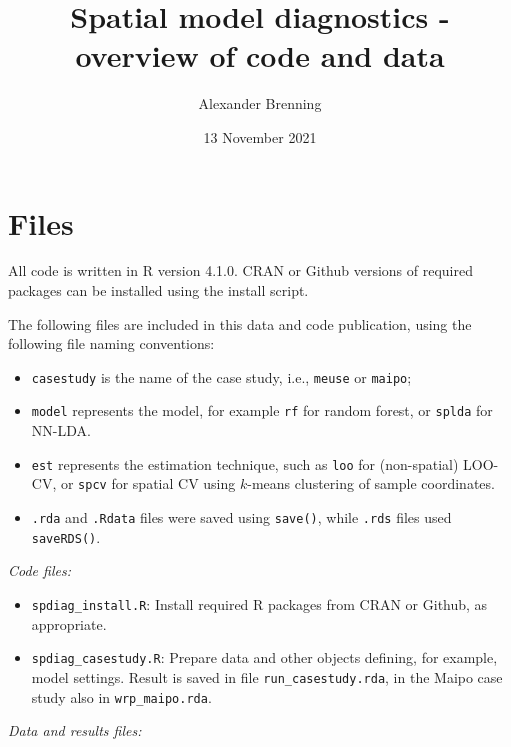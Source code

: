 \documentclass[
]{article}
\title{Spatial model diagnostics - overview of code and data}
\author{Alexander Brenning}
\date{13 November 2021}
\providecommand{\tightlist}{%
  \setlength{\itemsep}{0pt}\setlength{\parskip}{0pt}}
\begin{document}
\maketitle

\hypertarget{files}{%
\section{Files}\label{files}}

All code is written in R version 4.1.0.
CRAN or Github versions of required packages can be installed using the install script.

The following files are included in this data and code publication, using the following file naming conventions:

\begin{itemize}
\tightlist
\item
  \texttt{casestudy} is the name of the case study, i.e., \texttt{meuse} or \texttt{maipo};
\item
  \texttt{model} represents the model, for example \texttt{rf} for random forest, or \texttt{splda} for NN-LDA.
\item
  \texttt{est} represents the estimation technique, such as \texttt{loo} for (non-spatial) LOO-CV, or \texttt{spcv} for spatial CV using \(k\)-means clustering of sample coordinates.
\item
  \texttt{.rda} and \texttt{.Rdata} files were saved using \texttt{save()}, while \texttt{.rds} files used \texttt{saveRDS()}.
\end{itemize}

\emph{Code files:}

\begin{itemize}
\tightlist
\item
  \texttt{spdiag\_install.R}: Install required R packages from CRAN or Github, as appropriate.
\item
  \texttt{spdiag\_casestudy.R}: Prepare data and other objects defining, for example, model settings. Result is saved in file \texttt{run\_casestudy.rda}, in the Maipo case study also in \texttt{wrp\_maipo.rda}.
\end{itemize}

\emph{Data and results files:}
\end{document}
